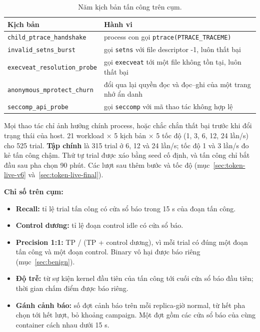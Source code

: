 \begin{longtable}[]{@{}>{\raggedright\arraybackslash}p{}>{\raggedright\arraybackslash}p{}@{}}
\caption{Năm kịch bản tấn công trên cụm.}\label{tab:scenarios}\\
\toprule\noalign{}
Kịch bản & Hành vi \\
\midrule\noalign{}
\endhead
\bottomrule\noalign{}
\endlastfoot
\texttt{child\_\allowbreak{}ptrace\_\allowbreak{}handshake} & process con gọi \texttt{ptrace(PTRACE\_\allowbreak{}TRACEME)} \\
\texttt{invalid\_\allowbreak{}setns\_\allowbreak{}burst} & gọi \texttt{setns} với file descriptor -1, luôn thất bại \\
\texttt{execveat\_\allowbreak{}resolution\_\allowbreak{}probe} & gọi \texttt{execveat} tới một file không tồn tại, luôn thất bại \\
\texttt{anonymous\_\allowbreak{}mprotect\_\allowbreak{}churn} & đổi qua lại quyền đọc và đọc--ghi của một trang nhớ ẩn danh \\
\texttt{seccomp\_\allowbreak{}api\_\allowbreak{}probe} & gọi \texttt{seccomp} với mã thao tác không hợp lệ \\
\end{longtable}

Mọi thao tác chỉ ảnh hưởng chính process, hoặc chắc chắn thất bại trước khi đổi trạng thái của host. 21 workload × 5 kịch bản × 5 tốc độ (1, 3, 6, 12, 24 lần/s) cho 525 trial. \textbf{Tập chính} là 315 trial ở 6, 12 và 24 lần/s; tốc độ 1 và 3 lần/s đo kẻ tấn công chậm. Thứ tự trial được xáo bằng seed cố định, và tấn công chỉ bắt đầu sau pha chọn 90 phút. Các lượt sau thêm bước và tốc độ (mục~\ref{sec:token-live-v6} và~\ref{sec:token-live-final}).

\textbf{Chỉ số trên cụm:}

\begin{itemize}
\tightlist
\item
  \textbf{Recall:} tỉ lệ trial tấn công có cửa sổ báo trong 15 s của đoạn tấn công.
\item
  \textbf{Control dương:} tỉ lệ đoạn control idle có cửa sổ báo.
\item
  \textbf{Precision 1:1:} TP / (TP + control dương), vì mỗi trial có đúng một đoạn tấn công và một đoạn control. Binary vô hại được báo riêng (mục~\ref{sec:benign}).
\item
  \textbf{Độ trễ:} từ sự kiện kernel đầu tiên của tấn công tới cuối cửa sổ báo đầu tiên; thời gian chấm điểm được báo riêng.
\item
  \textbf{Gánh cảnh báo:} số đợt cảnh báo trên mỗi replica-giờ normal, từ hết pha chọn tới hết lượt, bỏ khoảng campaign. Một đợt gồm các cửa sổ báo của cùng container cách nhau dưới 15 s.
\end{itemize}

